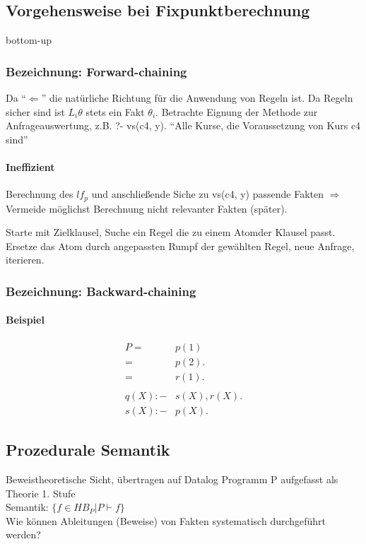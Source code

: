 \documentclass[12pt, a4paper]{article}
\begin{document}
\subsection*{Vorgehensweise bei Fixpunktberechnung} bottom-up

\subsubsection*{Bezeichnung: Forward-chaining}Da ``$\Leftarrow$'' die natürliche Richtung für die Anwendung von Regeln ist.
Da Regeln sicher sind ist $L_i \theta$ stets ein Fakt $\theta_i$.
Betrachte Eignung der Methode zur Anfrageauswertung, z.B. ?- vs(c4, y). ``Alle Kurse, die Voraussetzung von Kurs c4 sind''

\paragraph{Ineffizient} Berechnung des $lf_p$ und anschließende Siche zu vs(c4, y) passende Fakten $\Rightarrow$ Vermeide möglichst Berechnung nicht relevanter Fakten (später).

Starte mit Zielklausel, Suche ein Regel die zu einem Atomder Klausel passt. Ersetze das Atom durch angepassten Rumpf der gewählten Regel, neue Anfrage, iterieren.

\subsubsection*{Bezeichnung: Backward-chaining}
\paragraph{Beispiel}
\begin{equation}
\begin{split}
P = &p(1) \\
= &p(2). \\
= &r(1). \\
&\\
q(X) :- &s(X), r(X). \\
s(X) :- &p(X).
\end{split}
\end{equation}



\subsection*{Prozedurale Semantik}
Beweistheoretische Sicht, übertragen auf Datalog Programm P aufgefasst als Theorie 1. Stufe \\
Semantik: $\{f \in HB_P | P \vdash f \}$ \\
Wie können Ableitungen (Beweise) von Fakten systematisch durchgeführt werden?
\end{document}
